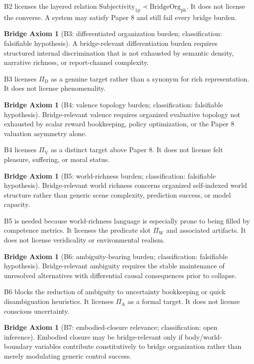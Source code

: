 \documentclass[11pt,a4paper]{article}
\theoremstyle{definition}
\newtheorem{axiom}[theorem]{Bridge Axiom}
\newcommand{\Subfp}{\mathrm{Subjectivity}_{\mathrm{1p}}}
\newcommand{\BridgeClass}{\mathrm{BridgeOrg}_{\mathrm{ph}}}
\newcommand{\PiD}{\Pi_{\mathrm{D}}}
\newcommand{\PiV}{\Pi_{\mathrm{V}}}
\newcommand{\PiW}{\Pi_{\mathrm{W}}}
\newcommand{\PiA}{\Pi_{\mathrm{A}}}
\begin{document}
B2 licenses the layered relation $\Subfp \prec \BridgeClass$. It does not license the converse. A system may satisfy Paper 8 and still fail every bridge burden.

\begin{axiom}[B3: differentiated organization burden; classification: falsifiable hypothesis]
A bridge-relevant differentiation burden requires structured internal discrimination that is not exhausted by semantic density, narrative richness, or report-channel complexity.
\end{axiom}

B3 licenses $\PiD$ as a genuine target rather than a synonym for rich representation. It does not license phenomenality.

\begin{axiom}[B4: valence topology burden; classification: falsifiable hypothesis]
Bridge-relevant valence requires organized evaluative topology not exhausted by scalar reward bookkeeping, policy optimization, or the Paper 8 valuation asymmetry alone.
\end{axiom}

B4 licenses $\PiV$ as a distinct target above Paper 8. It does not license felt pleasure, suffering, or moral status.

\begin{axiom}[B5: world-richness burden; classification: falsifiable hypothesis]
Bridge-relevant world richness concerns organized self-indexed world structure rather than generic scene complexity, prediction success, or model capacity.
\end{axiom}

B5 is needed because world-richness language is especially prone to being filled by competence metrics. It licenses the predicate slot $\PiW$ and associated artifacts. It does not license veridicality or environmental realism.

\begin{axiom}[B6: ambiguity-bearing burden; classification: falsifiable hypothesis]
Bridge-relevant ambiguity requires the stable maintenance of unresolved alternatives with differential causal consequences prior to collapse.
\end{axiom}

B6 blocks the reduction of ambiguity to uncertainty bookkeeping or quick disambiguation heuristics. It licenses $\PiA$ as a formal target. It does not license conscious uncertainty.

\begin{axiom}[B7: embodied-closure relevance; classification: open inference]
Embodied closure may be bridge-relevant only if body/world-boundary variables contribute constitutively to bridge organization rather than merely modulating generic control success.
\end{axiom}
\end{document}
